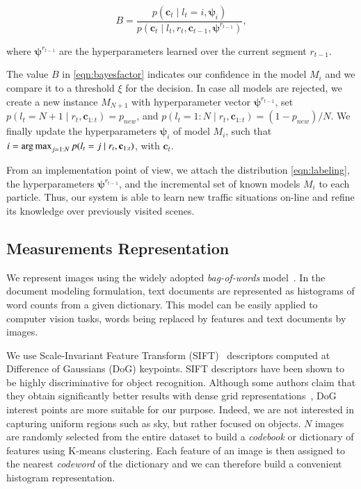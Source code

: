 \begin{equation}
\label{eqn:bayesfactor}
B = \frac{p(\mathbf{c}_t\mid l_t=i,\boldsymbol{\psi}_i)}{p(\mathbf{c}_t\mid
l_t,r_t,\mathbf{c}_{t-1},\boldsymbol{\psi}^{r_{t-1}})},
\end{equation}

where $\boldsymbol{\psi}^{r_{t-1}}$ are the hyperparameters learned over the
current segment $r_{t-1}$.

The value $B$ in \eqref{eqn:bayesfactor} indicates our confidence in the model
$M_i$ and we compare it to a threshold $\xi$ for the decision. In case all
models are rejected, we create a new instance $M_{N+1}$ with hyperparameter
vector $\boldsymbol{\psi}^{r_{t-1}}$, set $p(l_t=N+1\mid
r_t,\mathbf{c}_{1:t})=p_{new}$, and $p(l_t=1:N\mid r_t,\mathbf{c}_{1:t})=
(1-p_{new})/N$. We finally update the hyperparameters $\boldsymbol{\psi}_i$ of
model $M_i$, such that $i=\operatorname*{arg\,max}_{j=1:N}p(l_t=j\mid
r_t,\mathbf{c}_{1:t})$, with $\mathbf{c}_t$.

From an implementation point of view, we attach the distribution
\eqref{eqn:labeling}, the hyperparameters $\boldsymbol{\psi}^{r_{t-1}}$, and the
incremental set of known models $M_i$ to each particle. Thus, our system is able
to learn new traffic situations on-line and refine its knowledge over
previously visited scenes.

\subsection{Measurements Representation}
We represent images using the widely adopted \emph{bag-of-words}
model~\cite{sivic03video}. In the document modeling formulation, text documents
are represented as histograms of word counts from a given dictionary. This model
can be easily applied to computer vision tasks, words being replaced by features
and text documents by images.

We use Scale-Invariant Feature Transform (SIFT)~\cite{lowe04distinctive}
descriptors computed at Difference of Gaussians (DoG) keypoints. SIFT
descriptors have been shown to be highly discriminative for object recognition.
Although some authors claim that they obtain significantly better results with
dense grid representations~\cite{feifei05bayesian}, DoG interest points are more
suitable for our purpose. Indeed, we are not interested in capturing uniform
regions such as sky, but rather focused on objects. $N$ images are randomly
selected from the entire dataset to build a \emph{codebook} or dictionary of
features using K-means clustering. Each feature of an image is then assigned to
the nearest \emph{codeword} of the dictionary and we can therefore build a
convenient histogram representation.

